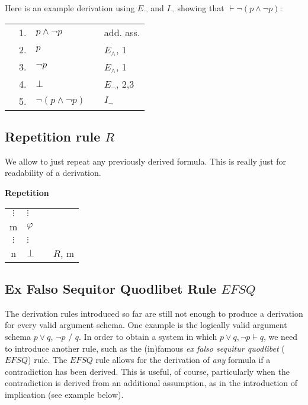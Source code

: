 \documentclass[nobib,nofonts]{tufte-handout}
\newcommand{\EFSQ}{\ensuremath{\mathit{EFSQ}}\xspace}
\begin{document}
Here is an example derivation using $E_{\neg}$ and $I_{\neg}$ showing that $\vdash \neg(p \wedge \neg p)$:

\bigskip

\begin{tabular}{cclcl}
  \cline{1-2} \vline & 1. & $p \wedge \neg p$       & & add. ass. \\
  \vline             & 2. & $p$                     & & $E_{\wedge}$, 1  \\
  \vline             & 3. & $\neg p$                & & $E_{\wedge}$, 1  \\
  \vline             & 4. & $\bot$                  & & $E_{\neg}$, 2,3  \\ \hline
                     & 5. & $\neg(p \wedge \neg p)$ & & $I_{\neg}$   \\
\end{tabular}


\subsection{Repetition rule $R$}

We allow to just repeat any previously derived formula.
This is really just for readability of a derivation.

\bigskip
\noindent \colorbox{mygray!60}{\centering
  \begin{minipage}[t]{0.35\linewidth}
    \textbf{Repetition}
  \end{minipage}
  \begin{minipage}[t]{0.55\linewidth}
    \begin{tabular}{clcl}
            $\vdots$ & $\vdots$  & \\
      m              & $\varphi$ &  \\
            $\vdots$ & $\vdots$  & \\
      n              & $\bot$    & & $R$, m
    \end{tabular}
  \end{minipage}
}
\bigskip

\subsection{Ex Falso Sequitor Quodlibet Rule $\EFSQ$}

The derivation rules introduced so far are still not enough to produce a derivation for every valid argument schema.
One example is the logically valid argument schema $p \vee q$, $\neg p$ / $q$.
In order to obtain a system in which $p \vee q, \neg p \vdash q$, we need to introduce another rule, such as the (in)famous \emph{ex falso sequitur quodlibet} (\EFSQ) rule.
The \EFSQ rule allows for the derivation of \emph{any} formula if a contradiction has been derived.
This is useful, of course, particularly when the contradiction is derived from an additional assumption, as in the introduction of implication (see example below).
\end{document}
